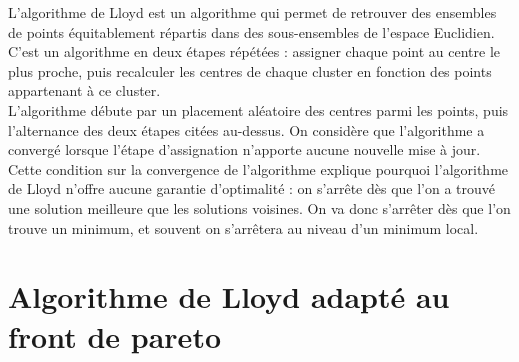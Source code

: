 ﻿\documentclass{meta}
\begin{document}
{L'algorithme de Lloyd est un algorithme qui permet de retrouver des ensembles de points équitablement répartis dans des sous-ensembles de l'espace Euclidien. C'est un algorithme en deux étapes répétées : assigner chaque point au centre le plus proche, puis recalculer les centres de chaque cluster en fonction des points appartenant à ce cluster.\\
L'algorithme débute par un placement aléatoire des centres parmi les points, puis l'alternance des deux étapes citées au-dessus. On considère que l'algorithme a convergé lorsque l'étape d'assignation n'apporte aucune nouvelle mise à jour.\\
Cette condition sur la convergence de l'algorithme explique pourquoi l'algorithme de Lloyd n'offre aucune garantie d'optimalité : on s'arrête dès que l'on a trouvé une solution meilleure que les solutions voisines. On va donc s'arrêter dès que l'on trouve un minimum, et souvent on s'arrêtera au niveau d'un minimum local.

\section{Algorithme de Lloyd adapté au front de pareto}

}
\end{document}
